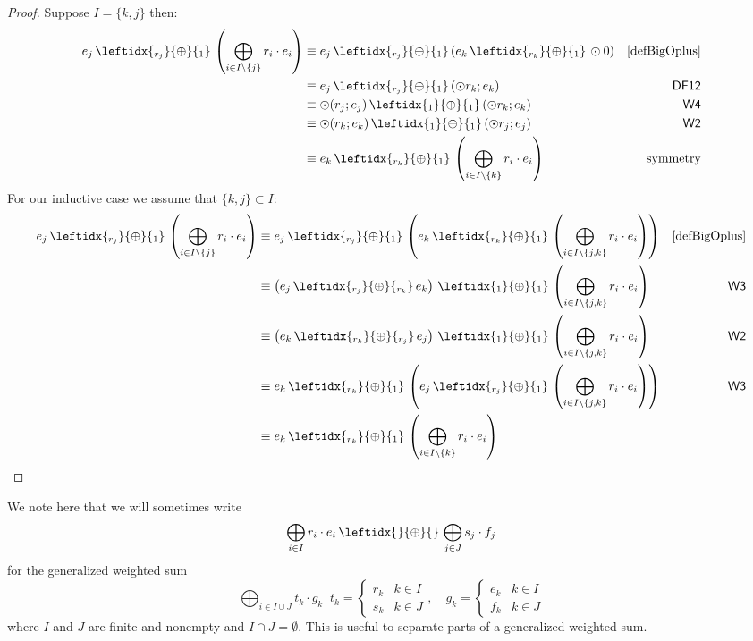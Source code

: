 \documentclass[a4paper,UKenglish,cleveref, autoref, thm-restate]{lipics-v2021}
\newcommand{\WC}[2]{\,\leftidx{_{#1}}{{\oplus}}{_{#2}}\,}
\newcommand{\Ax}[1]{\ensuremath{\mathsf{#1}}}
\theoremstyle{plain}\newtheoremrep{thm}{Theorem}[section]
\begin{document}
\begin{toappendix}
\begin{proof}
			Suppose $I =\{k,j\}$ then:
			\begin{align*}
				e_j \WC{r_j}{1} \left( \bigoplus_{i\in I\setminus\{j\}}r_i\cdot e_i \right) &\equiv e_j \WC{r_j}{1} (e_k \WC{r_k}{1} \odot 0) &\cref{defBigOplus}\\
				&\equiv e_j \WC{r_j}{1} (\odot r_k;e_k) &\Ax{DF12}\\
				&\equiv \odot (r_j; e_j) \WC{1}{1} (\odot r_k;e_k) &\Ax{W4}\\
				&\equiv \odot (r_k; e_k) \WC{1}{1} (\odot r_j;e_j) &\Ax{W2}\\
				&\equiv e_k \WC{r_k}{1} \left( \bigoplus_{i\in I\setminus\{k\}}r_i\cdot e_i \right)&\text{symmetry}
			\end{align*}
			For our inductive case we assume that $\{k,j\}\subset I$:
			\begin{align*}
				e_j \WC{r_j}{1} \left( \bigoplus_{i\in I\setminus\{j\}}r_i\cdot e_i \right) &\equiv e_j \WC{r_j}{1} \left(e_k \WC{r_k}{1}\left( \bigoplus_{i\in I\setminus\{j,k\}}r_i\cdot e_i \right)\right)&\cref{defBigOplus}\\
				& \equiv\left( e_j \WC{r_j}{r_k} e_k\right) \WC{1}{1}\left( \bigoplus_{i\in I\setminus\{j,k\}}r_i\cdot e_i \right)&\Ax{W3}\\
				& \equiv\left( e_k \WC{r_k}{r_j} e_j\right) \WC{1}{1}\left( \bigoplus_{i\in I\setminus\{j,k\}}r_i\cdot e_i \right)&\Ax{W2}\\
				& \equiv e_k \WC{r_k}{1} \left(e_j \WC{r_j}{1}\left( \bigoplus_{i\in I\setminus\{j,k\}}r_i\cdot e_i \right)\right)&\Ax{W3}\\
				& \equiv e_k \WC{r_k}{1} \left(\bigoplus_{i\in I\setminus\{k\}}r_i\cdot e_i \right)&\rlap{\qedhere} 
			\end{align*} 
		\end{proof}
		\begin{rem}
		We note here that we will sometimes write $$\bigoplus_{i \in I} r_i\cdot e_i \WC{}{} \bigoplus_{j \in J} s_j\cdot f_j$$ for the generalized weighted sum $$\bigoplus_{i \in I\cup J}t_k\cdot g_k \;\; t_k = \begin{cases}
			r_k & k \in I\\ s_k & k \in J 
		\end{cases},\quad g_k = \begin{cases}
		e_k & k \in I\\ f_k & k \in J
		\end{cases}$$ where $I$ and $J$ are finite and nonempty and $I \cap J = \emptyset$. This is useful to separate parts of a generalized weighted sum.

\end{rem}
\end{toappendix}
\end{document}
